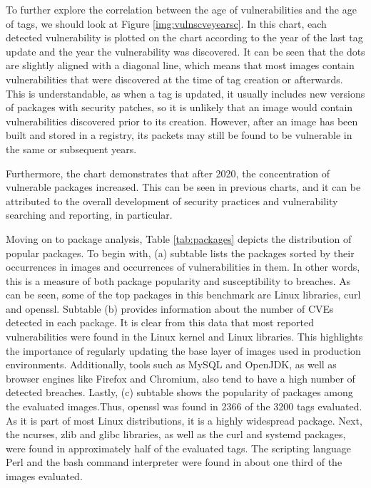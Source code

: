 To further explore the correlation between the age of vulnerabilities and the age of tags, we should look at Figure \ref{img:vulnscveyearsc}. In this chart, each detected vulnerability is plotted on the chart according to the year of the last tag update and the year the vulnerability was discovered. It can be seen that the dots are slightly aligned with a diagonal line, which means that most images contain vulnerabilities that were discovered at the time of tag creation or afterwards. This is understandable, as when a tag is updated, it usually includes new versions of packages with security patches, so it is unlikely that an image would contain vulnerabilities discovered prior to its creation. However, after an image has been built and stored in a registry, its packets may still be found to be vulnerable in the same or subsequent years.

Furthermore, the chart demonstrates that after 2020, the concentration of vulnerable packages increased. This can be seen in previous charts, and it can be attributed to the overall development of security practices and vulnerability searching and reporting, in particular.



Moving on to package analysis, Table \ref{tab:packages} depicts the distribution of popular packages. To begin with, (a) subtable lists the packages sorted by their occurrences in images and occurrences of vulnerabilities in them. In other words, this is a measure of both package popularity and susceptibility to breaches. As can be seen, some of the top packages in this benchmark are Linux libraries, curl and openssl. Subtable (b) provides information about the number of CVEs detected in each package. It is clear from this data that most reported vulnerabilities were found in the Linux kernel and Linux libraries. This highlights the importance of regularly updating the base layer of images used in production environments. Additionally, tools such as MySQL and OpenJDK, as well as browser engines like Firefox and Chromium, also tend to have a high number of detected breaches. Lastly, (c) subtable shows the popularity of packages among the evaluated images.Thus, openssl was found in 2366 of the 3200 tags evaluated. As it is part of most Linux distributions, it is a highly widespread package. Next, the ncurses, zlib and glibc libraries, as well as the curl and systemd packages, were found in approximately half of the evaluated tags. The scripting language Perl and the bash command interpreter were found in about one third of the images evaluated.

